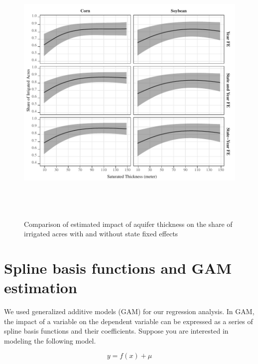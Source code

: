 \documentclass[
]{article}
\begin{document}
\begin{figure}[H]

{\centering \includegraphics[width=6in,height=500px,]{Figures/g_share_comp} 

}

\caption{Comparison of estimated impact of aquifer thickness on the share of irrigated acres with and without state fixed effects}\label{fig:state-fe-with-without}
\end{figure}

\clearpage

\hypertarget{spline-basis}{%
\section{Spline basis functions and GAM estimation}\label{spline-basis}}

\setcounter{figure}{0}
\renewcommand{\thefigure}{C.\arabic{figure}}

We used generalized additive models (GAM) for our regression analysis. In GAM, the impact of a variable on the dependent variable can be expressed as a series of spline basis functions and their coefficients. Suppose you are interested in modeling the following model.

\begin{equation}
y = f(x) + \mu
\end{equation}
\end{document}
